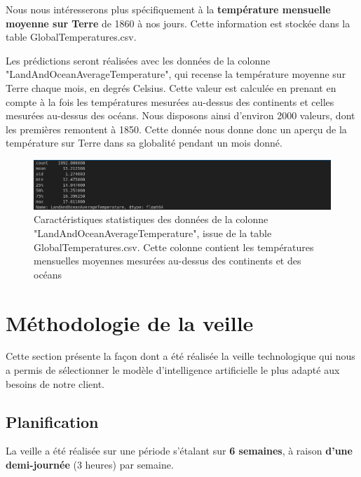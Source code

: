 \documentclass[french]{article}
\begin{document}
    Nous nous intéresserons  plus spécifiquement à la \textbf{température mensuelle moyenne sur Terre} de 1860 à nos jours. Cette information est stockée dans la table GlobalTemperatures.csv.
    


    Les prédictions seront réalisées avec les données de la colonne "LandAndOceanAverageTemperature", qui recense la température moyenne sur Terre chaque mois, en degrés Celsius. Cette valeur est calculée en prenant en compte à la fois les températures mesurées au-dessus des continents et celles mesurées au-dessus des océans. Nous disposons ainsi d'environ 2000 valeurs, dont les premières remontent à 1850. Cette donnée nous donne donc un aperçu de la température sur Terre dans sa globalité pendant un mois donné.
    \begin{figure}[h!]
        \includegraphics[width=12cm]{dataset}
        \centering
        \caption{Caractéristiques statistiques des données de la colonne "LandAndOceanAverageTemperature", issue de la table GlobalTemperatures.csv. Cette colonne contient les températures mensuelles moyennes mesurées au-dessus des continents et des océans}
        \centering
    \end{figure}

    \section{Méthodologie de la veille}
    Cette section présente la façon dont a été réalisée la veille technologique qui nous a permis de sélectionner le modèle d'intelligence artificielle le plus adapté aux besoins de notre client.

    \subsection{Planification}

    La veille a été réalisée sur une période s'étalant sur \textbf{6 semaines}, à raison \textbf{d'une demi-journée} (3 heures) par semaine.
\end{document}
